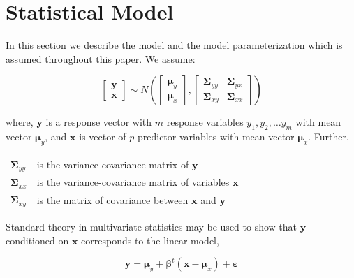 \documentclass[3p,times,12pt,authoryear]{elsarticle}
\theoremstyle{definition}
\theoremstyle{definition}
\theoremstyle{remark}
\begin{document}
\section{Statistical Model}\label{statistical-model}

In this section we describe the model and the model parameterization
which is assumed throughout this paper. We assume:

\begin{equation}
  \begin{bmatrix}\mathbf{y}\\ \mathbf{x}\end{bmatrix} \sim N
  \left(
    \begin{bmatrix}
      \boldsymbol{\mu}_y \\
      \boldsymbol{\mu}_x
    \end{bmatrix},
    \begin{bmatrix}
      \boldsymbol{\Sigma}_{yy} & \boldsymbol{\Sigma}_{yx} \\
      \boldsymbol{\Sigma}_{xy} & \boldsymbol{\Sigma}_{xx}
    \end{bmatrix}
  \right)
  \label{eq:rand-reg-model}
\end{equation}

where, \(\mathbf{y}\) is a response vector with \(m\) response variables
\(y_1, y_2, \ldots y_m\) with mean vector \(\boldsymbol{\mu}_y\), and
\(\mathbf{x}\) is vector of \(p\) predictor variables with mean vector
\(\boldsymbol{\mu}_x\). Further,

\begin{longtable}[]{@{}ll@{}}
\toprule
\(\boldsymbol{\Sigma}_{yy}\) & is the variance-covariance matrix of
\(\mathbf{y}\)\tabularnewline
\(\boldsymbol{\Sigma}_{xx}\) & is the variance-covariance matrix of
variables \(\mathbf{x}\)\tabularnewline
\(\boldsymbol{\Sigma}_{xy}\) & is the matrix of covariance between
\(\mathbf{x}\) and \(\mathbf{y}\)\tabularnewline
\bottomrule
\end{longtable}

\addtocounter{table}{-1}

Standard theory in multivariate statistics may be used to show that
\(\mathbf{y}\) conditioned on \(\mathbf{x}\) corresponds to the linear
model,

\begin{equation}
\mathbf{y} = \boldsymbol{\mu}_y + \boldsymbol{\beta}^t (\mathbf{x} - \boldsymbol{\mu}_x) + \boldsymbol{\varepsilon}
  \label{eq:linear-model}
\end{equation}
\end{document}
